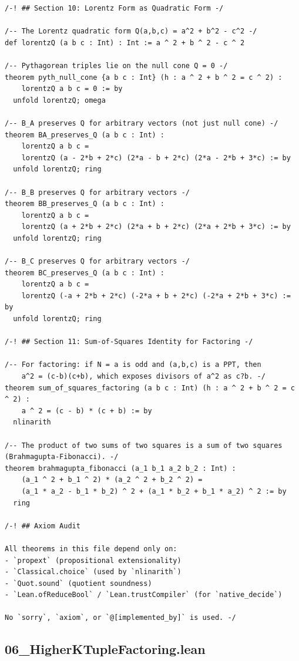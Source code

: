 \documentclass[11pt,openright,twoside]{book}
\theoremstyle{definition}
\begin{document}
\begin{lstlisting}[style=lean]
/-! ## Section 10: Lorentz Form as Quadratic Form -/

/-- The Lorentz quadratic form Q(a,b,c) = a^2 + b^2 - c^2 -/
def lorentzQ (a b c : Int) : Int := a ^ 2 + b ^ 2 - c ^ 2

/-- Pythagorean triples lie on the null cone Q = 0 -/
theorem pyth_null_cone {a b c : Int} (h : a ^ 2 + b ^ 2 = c ^ 2) :
    lorentzQ a b c = 0 := by
  unfold lorentzQ; omega

/-- B_A preserves Q for arbitrary vectors (not just null cone) -/
theorem BA_preserves_Q (a b c : Int) :
    lorentzQ a b c =
    lorentzQ (a - 2*b + 2*c) (2*a - b + 2*c) (2*a - 2*b + 3*c) := by
  unfold lorentzQ; ring

/-- B_B preserves Q for arbitrary vectors -/
theorem BB_preserves_Q (a b c : Int) :
    lorentzQ a b c =
    lorentzQ (a + 2*b + 2*c) (2*a + b + 2*c) (2*a + 2*b + 3*c) := by
  unfold lorentzQ; ring

/-- B_C preserves Q for arbitrary vectors -/
theorem BC_preserves_Q (a b c : Int) :
    lorentzQ a b c =
    lorentzQ (-a + 2*b + 2*c) (-2*a + b + 2*c) (-2*a + 2*b + 3*c) := by
  unfold lorentzQ; ring

/-! ## Section 11: Sum-of-Squares Identity for Factoring -/

/-- For factoring: if N = a is odd and (a,b,c) is a PPT, then
    a^2 = (c-b)(c+b), which exposes divisors of a^2 as c?b. -/
theorem sum_of_squares_factoring (a b c : Int) (h : a ^ 2 + b ^ 2 = c ^ 2) :
    a ^ 2 = (c - b) * (c + b) := by
  nlinarith

/-- The product of two sums of two squares is a sum of two squares (Brahmagupta-Fibonacci). -/
theorem brahmagupta_fibonacci (a_1 b_1 a_2 b_2 : Int) :
    (a_1 ^ 2 + b_1 ^ 2) * (a_2 ^ 2 + b_2 ^ 2) =
    (a_1 * a_2 - b_1 * b_2) ^ 2 + (a_1 * b_2 + b_1 * a_2) ^ 2 := by
  ring

/-! ## Axiom Audit

All theorems in this file depend only on:
- `propext` (propositional extensionality)
- `Classical.choice` (used by `nlinarith`)
- `Quot.sound` (quotient soundness)
- `Lean.ofReduceBool` / `Lean.trustCompiler` (for `native_decide`)

No `sorry`, `axiom`, or `@[implemented_by]` is used. -/
\end{lstlisting}

\clearpage


\subsection*{06\_HigherKTupleFactoring.lean}
\label{lean:06_HigherKTupleFactoring}
\end{document}
